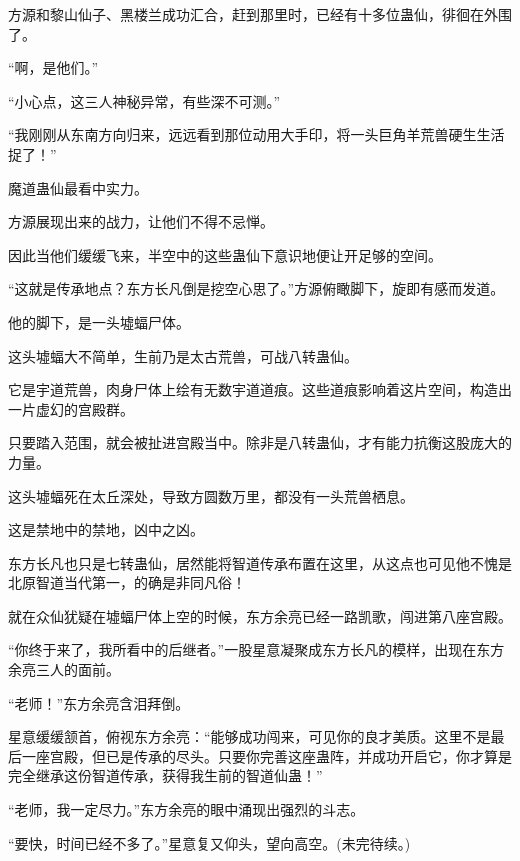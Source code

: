 \begin{this_body}
方源和黎山仙子、黑楼兰成功汇合，赶到那里时，已经有十多位蛊仙，徘徊在外围了。

“啊，是他们。”

“小心点，这三人神秘异常，有些深不可测。”

“我刚刚从东南方向归来，远远看到那位动用大手印，将一头巨角羊荒兽硬生生活捉了！”

魔道蛊仙最看中实力。

方源展现出来的战力，让他们不得不忌惮。

因此当他们缓缓飞来，半空中的这些蛊仙下意识地便让开足够的空间。

“这就是传承地点？东方长凡倒是挖空心思了。”方源俯瞰脚下，旋即有感而发道。

他的脚下，是一头墟蝠尸体。

这头墟蝠大不简单，生前乃是太古荒兽，可战八转蛊仙。

它是宇道荒兽，肉身尸体上绘有无数宇道道痕。这些道痕影响着这片空间，构造出一片虚幻的宫殿群。

只要踏入范围，就会被扯进宫殿当中。除非是八转蛊仙，才有能力抗衡这股庞大的力量。

这头墟蝠死在太丘深处，导致方圆数万里，都没有一头荒兽栖息。

这是禁地中的禁地，凶中之凶。

东方长凡也只是七转蛊仙，居然能将智道传承布置在这里，从这点也可见他不愧是北原智道当代第一，的确是非同凡俗！

就在众仙犹疑在墟蝠尸体上空的时候，东方余亮已经一路凯歌，闯进第八座宫殿。

“你终于来了，我所看中的后继者。”一股星意凝聚成东方长凡的模样，出现在东方余亮三人的面前。

“老师！”东方余亮含泪拜倒。

星意缓缓颔首，俯视东方余亮：“能够成功闯来，可见你的良才美质。这里不是最后一座宫殿，但已是传承的尽头。只要你完善这座蛊阵，并成功开启它，你才算是完全继承这份智道传承，获得我生前的智道仙蛊！”

“老师，我一定尽力。”东方余亮的眼中涌现出强烈的斗志。

“要快，时间已经不多了。”星意复又仰头，望向高空。(未完待续。)

\end{this_body}

